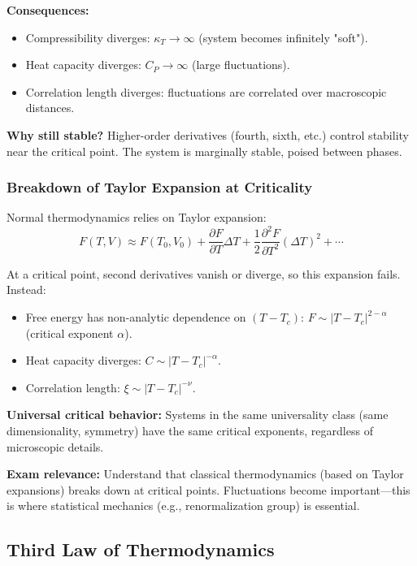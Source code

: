 \documentclass[9pt,twocoloumn]{article}
\begin{document}
\textbf{Consequences:}
\begin{itemize}
    \item Compressibility diverges: $\kappa_T \to \infty$ (system becomes infinitely "soft").
    \item Heat capacity diverges: $C_P \to \infty$ (large fluctuations).
    \item Correlation length diverges: fluctuations are correlated over macroscopic distances.
\end{itemize}

\textbf{Why still stable?} Higher-order derivatives (fourth, sixth, etc.) control stability near the critical point. The system is marginally stable, poised between phases.

\subsubsection{Breakdown of Taylor Expansion at Criticality}

Normal thermodynamics relies on Taylor expansion:
\begin{equation}
F(T, V) \approx F(T_0, V_0) + \frac{\partial F}{\partial T} \Delta T + \frac{1}{2} \frac{\partial^2 F}{\partial T^2} (\Delta T)^2 + \cdots
\end{equation}

At a critical point, second derivatives vanish or diverge, so this expansion fails. Instead:
\begin{itemize}
    \item Free energy has non-analytic dependence on $(T - T_c)$: $F \sim |T - T_c|^{2-\alpha}$ (critical exponent $\alpha$).
    \item Heat capacity diverges: $C \sim |T - T_c|^{-\alpha}$.
    \item Correlation length: $\xi \sim |T - T_c|^{-\nu}$.
\end{itemize}

\textbf{Universal critical behavior:} Systems in the same universality class (same dimensionality, symmetry) have the same critical exponents, regardless of microscopic details.

\textbf{Exam relevance:} Understand that classical thermodynamics (based on Taylor expansions) breaks down at critical points. Fluctuations become important—this is where statistical mechanics (e.g., renormalization group) is essential.

\subsection{Third Law of Thermodynamics}
\end{document}
